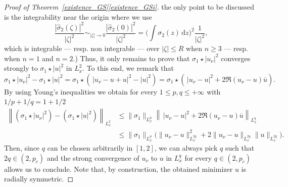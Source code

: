 \documentclass[11pt]{article}
\newcommand{\resp}{resp.\xspace}
\let\oldbar\bar\let\oldhat\hat\let\oldtilde\tilde
\let\bar\oldbar
\let\hat\oldhat
\let\tilde\oldtilde
\theoremstyle{definition}
\let\bar\overline
\let\hat\widehat
\let\tilde\widetilde
\newenvironment{ProofOf}[1]{\begin{proof}[Proof of #1]}{\end{proof}}
\newcommand{\ud}{\, {\mathrm{d}}}
\begin{document}
\begin{ProofOf}{Theorem~\ref{existence_GS}\eqref{existence_GSi}}
the only point to be discussed is the integrability near the origin where we use
\[
\frac{|\widehat{\sigma}_{2}(\zeta)|^2}{|\zeta|^2}\sim_{|\zeta|\to 0} \frac{|\widehat{\sigma}_{2}(0)|^2}{|\zeta|^2}
=\biggl(\int \sigma_2(z)\ud z\biggr)^2\frac{1}{|\zeta|^2},
\]
which is integrable --- \resp non integrable --- over $|\zeta|\leq R$ when $n\geq 3$ --- \resp when $n=1$ and $n=2$.)
Thus, it only remains to prove that $\sigma_{1}\star|u_{\nu}|^{2}$ converges strongly to $\sigma_{1}\star|u|^{2}$ in $L_{x}^{2}$. To this end, we remark that
\[
\sigma_{1}\star|u_{\nu}|^{2}-\sigma_{1}\star|u|^{2}=\sigma_{1}\star\left(\,|u_{\nu}-u+u|^{2}-|u|^{2}\right)=\sigma_{1}\star\left(\,|u_{\nu}-u|^{2}+2\Re (u_{\nu}-u)\bar{u}\right).
\]
By using Young's inequalities \cite[Th.\,4.2]{LL} we obtain for every $1\leq p,q\leq+\infty$ with $1/p+1/q=1+1/2$
\begin{align*}
\left\|(\sigma_{1}\star|u_{\nu}|^{2})-(\sigma_{1}\star|u|^{2})\right\|_{L_{x}^{2}}&\leq\|\sigma_{1}\|_{L_{x}^{p}}\left\|\,|u_{\nu}-u|^{2}+2\Re (u_{\nu}-u)\bar{u}\right\|_{L_{x}^{q}}\\
&\leq\|\sigma_{1}\|_{L_{x}^{p}}\bigl(\|u_{\nu}-u\|_{L_{x}^{2q}}^{2}+2\|u_{\nu}-u\|_{L_{x}^{2q}}\|u\|_{L_{x}^{2q}}\bigr).
\end{align*}
Then, since $q$ can be chosen arbitrarily in $[1,2]$, we can always pick $q$ such that $2q\in(2,p_{c})$ and the strong convergence of $u_{\nu}$ to $u$ in $L_{x}^{q}$ for every $q\in(2,p_{c})$ allows us to conclude.
Note that, by construction, the obtained minimizer $u$ is radially symmetric.
\end{ProofOf}
\end{document}
